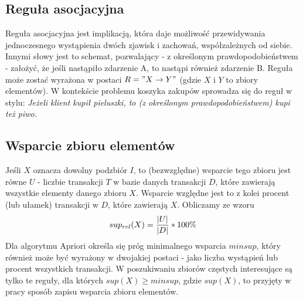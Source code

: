 \subsection{Reguła asocjacyjna}
\label{c222}
Reguła asocjacyjna jest implikacją, która daje możliwość przewidywania jednoczesnego wystąpienia dwóch zjawisk i zachowań, współzależnych od siebie. Innymi słowy jest to schemat, pozwalający - z określonym prawdopodobieństwem - założyć, że jeśli nastąpiło zdarzenie A, to nastąpi również zdarzenie B. Reguła może zostać wyrażona w postaci \(R = "X\rightarrow Y"\) (gdzie \(X\) i \(Y\) to zbiory elementów). W kontekście problemu koszyka zakupów sprowadza się do reguł w stylu: \textit{Jeżeli klient kupił pieluszki, to (z określonym prawdopodobieństwem) kupi też piwo.} 

\subsection{Wsparcie zbioru elementów}
\label{c223}
Jeśli \(X\) oznacza dowolny podzbiór \(I\), to (bezwzględne) wsparcie tego zbioru jest równe \(U\) - liczbie transakcji \(T\) w bazie danych transakcji \(D\), które zawierają wszystkie elementy danego zbioru \(X\). Wsparcie względne jest to z kolei procent (lub ułamek) transakcji w \(D\), które zawierają \(X\). Obliczamy ze wzoru \[sup_{rel}(X)=\nolinebreak\frac{|U|}{|D|}*100\%\] Dla algorytmu Apriori określa się próg minimalnego wsparcia \(minsup\), który również może być wyrażony w dwojakiej postaci - jako liczba wystąpień lub procent wszystkich transakcji. W poszukiwaniu zbiorów częstych interesujące są tylko te reguły, dla których \(sup(X) \geq minsup \), gdzie \(sup(X)\), to przyjęty w pracy sposób zapisu wsparcia zbioru elementów.

